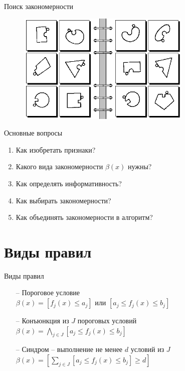 \documentclass[10pt]{beamer}
\begin{document}
\begin{frame}{Поиск закономерности}
	\begin{figure}[htbp]
	  \includegraphics[height=150pt, keepaspectratio = true]{images/bongard55}   
	\end{figure}
\end{frame}

\begin{frame}{Основные вопросы}
	\begin{enumerate}
		\item Как изобретать признаки? 
		\item Какого вида закономерности $\beta(x)$ нужны?
		\item Как определять информативность? 
		\item Как выбирать закономерности?
		\item Как объединять закономерности в алгоритм?
	\end{enumerate}
\end{frame}

\section{Виды правил}

\begin{frame}{Виды правил}
	\begin{itemize} [<+->]
	\item[--] Пороговое условие\\
	$\beta(x) = \left[f_j(x) \leq a_j \right]$ или  $\left[a_j \leq f_j(x) \leq b_j \right]$
	\item[--] Конъюнкция из $J$ пороговых условий \\
	$\beta(x) = \bigwedge\limits_{j \in J} \left[a_j \leq f_j(x) \leq b_j \right]$
	\item[--] Синдром -- выполнение не менее $d$ условий из $J$
	$\beta(x) = \left[\sum\limits_{j \in J} \left[a_j \leq f_j(x) \leq b_j \right] \geq d \right]$
	\end{itemize}
\end{frame}
\end{document}
